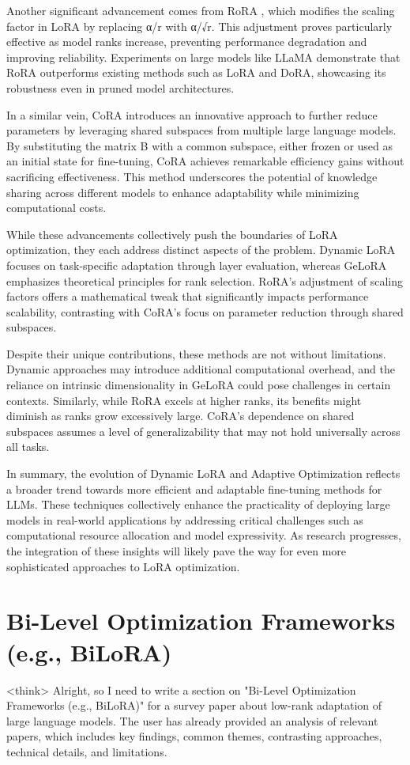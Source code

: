 \documentclass[conference]{IEEEtran}
\begin{document}
Another significant advancement comes from RoRA \cite{b3}, which modifies the scaling factor in LoRA by replacing α/r with α/√r. This adjustment proves particularly effective as model ranks increase, preventing performance degradation and improving reliability. Experiments on large models like LLaMA demonstrate that RoRA outperforms existing methods such as LoRA and DoRA, showcasing its robustness even in pruned model architectures.

In a similar vein, CoRA \cite{b4} introduces an innovative approach to further reduce parameters by leveraging shared subspaces from multiple large language models. By substituting the matrix B with a common subspace, either frozen or used as an initial state for fine-tuning, CoRA achieves remarkable efficiency gains without sacrificing effectiveness. This method underscores the potential of knowledge sharing across different models to enhance adaptability while minimizing computational costs.

While these advancements collectively push the boundaries of LoRA optimization, they each address distinct aspects of the problem. Dynamic LoRA focuses on task-specific adaptation through layer evaluation, whereas GeLoRA emphasizes theoretical principles for rank selection. RoRA's adjustment of scaling factors offers a mathematical tweak that significantly impacts performance scalability, contrasting with CoRA's focus on parameter reduction through shared subspaces.

Despite their unique contributions, these methods are not without limitations. Dynamic approaches may introduce additional computational overhead, and the reliance on intrinsic dimensionality in GeLoRA could pose challenges in certain contexts. Similarly, while RoRA excels at higher ranks, its benefits might diminish as ranks grow excessively large. CoRA's dependence on shared subspaces assumes a level of generalizability that may not hold universally across all tasks.

In summary, the evolution of Dynamic LoRA and Adaptive Optimization reflects a broader trend towards more efficient and adaptable fine-tuning methods for LLMs. These techniques collectively enhance the practicality of deploying large models in real-world applications by addressing critical challenges such as computational resource allocation and model expressivity. As research progresses, the integration of these insights will likely pave the way for even more sophisticated approaches to LoRA optimization.

\section{Bi-Level Optimization Frameworks (e.g., BiLoRA)}
<think>
Alright, so I need to write a section on "Bi-Level Optimization Frameworks (e.g., BiLoRA)" for a survey paper about low-rank adaptation of large language models. The user has already provided an analysis of relevant papers, which includes key findings, common themes, contrasting approaches, technical details, and limitations.
\end{document}
